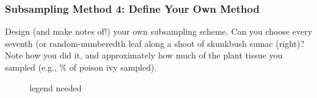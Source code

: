 \documentclass[
  letterpaper,
  DIV=11,
  numbers=noendperiod]{scrreprt}
\begin{document}
\subsubsection{Subsampling Method 4: Define Your Own
Method}\label{subsampling-method-4-define-your-own-method}

Design (and make notes of!) your own subsampling scheme. Can you choose
every seventh (or random-numberedth leaf along a shoot of skunkbush
sumac (right)? Note how you did it, and approximately how much of the
plant tissue you sampled (e.g., \% of poison ivy sampled).

\begin{figure}


\caption{\label{fig-random}legend needed}

\end{figure}%
\end{document}
